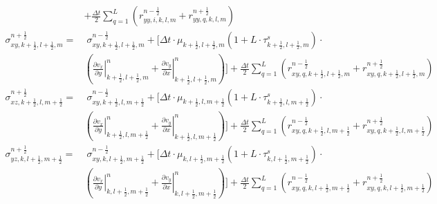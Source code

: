 \documentclass[pdftex,a4paper,parskip,listof=totoc,bibliography=totoc,onehalfspacing,12pt]{scrreprt}
\begin{document}
\begin{align*}
	&+ \frac{\Delta t}{2} \sum _{q=1}^{L} \left( r_{yy,i,k,l,m}^{n-\frac{1}{2}}+ r_{yy,q,k,l,m}^{n+\frac{1}{2}}\right)\\ 
	\sigma_{xy,k+\frac{1}{2},l+\frac{1}{2},m}^{n+\frac{1}{2}} =&\;\sigma_{xy,k+\frac{1}{2},l+\frac{1}{2},m}^{n-\frac{1}{2}}+\Bigg[\Delta t \cdot \mu_{k+\frac{1}{2},l+\frac{1}{2},m}\left(1+L\cdot\tau_{k+\frac{1}{2},l+\frac{1}{2},m}^s \right)\cdot \\ 
	&\left( \left.\frac{\partial v_x}{\partial y}\right\rvert_{k+\frac{1}{2},l+\frac{1}{2},m}^n + \left.\frac{\partial v_y}{\partial x}\right\rvert_{k+\frac{1}{2},l+\frac{1}{2},m}^n \right)\Bigg] + \frac{\Delta t}{2} \sum _{q=1}^{L} \left( r_{xy,q,k+\frac{1}{2},l+\frac{1}{2},m}^{n-\frac{1}{2}}+ r_{xy,q,k+\frac{1}{2},l+\frac{1}{2},m}^{n+\frac{1}{2}}\right) \\
	\sigma_{xz,k+\frac{1}{2},l,m+\frac{1}{2}}^{n+\frac{1}{2}} =&\;\sigma_{xy,k+\frac{1}{2},l,m+\frac{1}{2}}^{n-\frac{1}{2}}+\Bigg[\Delta t \cdot \mu_{k+\frac{1}{2},l,m+\frac{1}{2}}\left(1+L\cdot\tau_{k+\frac{1}{2},l,m+\frac{1}{2}}^s \right)\cdot \\ 
	&\left( \left.\frac{\partial v_x}{\partial y}\right\rvert_{k+\frac{1}{2},l,m+\frac{1}{2}}^n + \left.\frac{\partial v_y}{\partial x}\right\rvert_{k+\frac{1}{2},l,m+\frac{1}{2}}^n \right)\Bigg]  + \frac{\Delta t}{2} \sum _{q=1}^{L} \left( r_{xy,q,k+\frac{1}{2},l,m+\frac{1}{2}}^{n-\frac{1}{2}}+ r_{xy,q,k+\frac{1}{2},l,m+\frac{1}{2}}^{n+\frac{1}{2}}\right) \\
	\sigma_{yz,k,l+\frac{1}{2},m+\frac{1}{2}}^{n+\frac{1}{2}} =& \;\sigma_{xy,k,l+\frac{1}{2},m+\frac{1}{2}}^{n-\frac{1}{2}}+\Bigg[\Delta t \cdot \mu_{k,l+\frac{1}{2},m+\frac{1}{2}}\left(1+L\cdot\tau_{k,l+\frac{1}{2},m+\frac{1}{2}}^s \right)\cdot \\ 
	&\left( \left.\frac{\partial v_x}{\partial y}\right\rvert_{k,l+\frac{1}{2},m+\frac{1}{2}}^n + \left.\frac{\partial v_y}{\partial x}\right\rvert_{k,l+\frac{1}{2},m+\frac{1}{2}}^n \right)\Bigg]  + \frac{\Delta t}{2} \sum _{q=1}^{L} \left( r_{xy,q,k,l+\frac{1}{2},m+\frac{1}{2}}^{n-\frac{1}{2}}+ r_{xy,q,k,l+\frac{1}{2},m+\frac{1}{2}}^{n+\frac{1}{2}}\right) \\
\end{align*}
\end{document}
